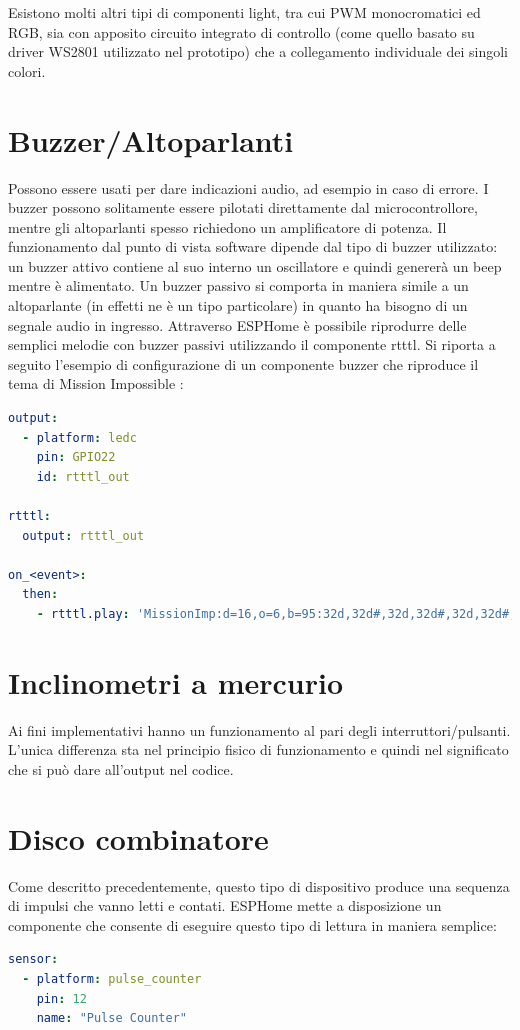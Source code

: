 \documentclass[12pt,a4paper]{report}
\begin{document}
Esistono molti altri tipi di componenti light, tra cui PWM monocromatici ed RGB, sia con apposito circuito integrato di controllo (come
quello basato su driver WS2801 utilizzato nel prototipo) che a collegamento individuale dei singoli colori.



\section{Buzzer/Altoparlanti}
Possono essere usati per dare indicazioni audio, ad esempio in caso di errore. I buzzer possono solitamente essere pilotati direttamente
dal microcontrollore, mentre gli altoparlanti spesso richiedono un amplificatore di potenza.
Il funzionamento dal punto di vista software dipende dal tipo di buzzer utilizzato: un buzzer attivo contiene al suo interno un oscillatore
e quindi genererà un beep mentre è alimentato. Un buzzer passivo si comporta in maniera simile a un altoparlante (in effetti ne è un tipo
particolare) in quanto ha bisogno di un segnale audio in ingresso.
Attraverso ESPHome è possibile riprodurre delle semplici melodie con buzzer passivi utilizzando il componente rtttl. Si riporta a seguito
l'esempio di configurazione di un componente buzzer che riproduce il tema di Mission Impossible \cite{esphomeio}:
\begin{lstlisting}[language=yaml]
output:
  - platform: ledc
    pin: GPIO22
    id: rtttl_out

rtttl:
  output: rtttl_out

on_<event>:
  then:
    - rtttl.play: 'MissionImp:d=16,o=6,b=95:32d,32d#,32d,32d#,32d,32d#,32d,32d#,32d,32d,32d#,32e,32f,32f#,32g,g,8p,g,8p,a#,p,c7,p,g,8p,g,8p,f,p,f#,p,g,8p,g,8p,a#,p,c7,p,g,8p,g,8p,f,p,f#,p,a#,g,2d,32p,a#,g,2c#,32p,a#,g,2c,a#5,8c,2p,32p,a#5,g5,2f#,32p,a#5,g5,2f,32p,a#5,g5,2e,d#,8d'
\end{lstlisting}
\section{Inclinometri a mercurio}
Ai fini implementativi hanno un funzionamento al pari degli interruttori/pulsanti. L'unica differenza sta nel principio fisico di funzionamento
e quindi nel significato che si può dare all'output nel codice.

\section{Disco combinatore}
Come descritto precedentemente, questo tipo di dispositivo produce una sequenza di impulsi che vanno letti e contati. ESPHome mette
a disposizione un componente che consente di eseguire questo tipo di lettura in maniera semplice:
\begin{lstlisting}[language=yaml]
sensor:
  - platform: pulse_counter
    pin: 12
    name: "Pulse Counter"
\end{lstlisting}
\end{document}
